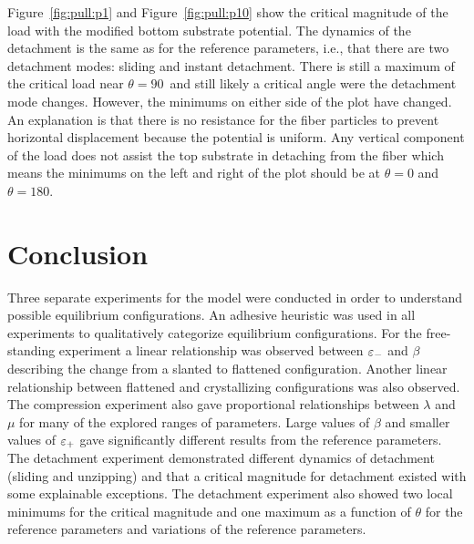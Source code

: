 Figure~\ref{fig:pull:p1} and Figure~\ref{fig:pull:p10} show the critical magnitude of the load with the modified bottom substrate potential. The dynamics of the detachment is the same as for the reference parameters, i.e., that there are two detachment modes: sliding and instant detachment. There is still a maximum of the critical load near $\theta=90$\textdegree\ and still likely a critical angle were the detachment mode changes. However, the minimums on either side of the plot have changed. An explanation is that there is no resistance for the fiber particles to prevent horizontal displacement because the potential is uniform. Any vertical component of the load does not assist the top substrate in detaching from the fiber which means the minimums on the left and right of the plot should be at $\theta=0$ and $\theta=180$.

\section{Conclusion}

Three separate experiments for the model were conducted in order to understand possible equilibrium configurations. An adhesive heuristic was used in all experiments to qualitatively categorize equilibrium configurations. For the free-standing experiment a linear relationship was observed between $\varepsilon_-$ and $\beta$ describing the change from a slanted to flattened configuration. Another linear relationship between flattened and crystallizing configurations was also observed. The compression experiment also gave proportional relationships between $\lambda$ and $\mu$ for many of the explored ranges of parameters. Large values of $\beta$ and smaller values of $\varepsilon_+$ gave significantly different results from the reference parameters. The detachment experiment demonstrated different dynamics of detachment (sliding and unzipping) and that a critical magnitude for detachment existed with some explainable exceptions. The detachment experiment also showed two local minimums for the critical magnitude and one maximum as a function of $\theta$ for the reference parameters and variations of the reference parameters.
